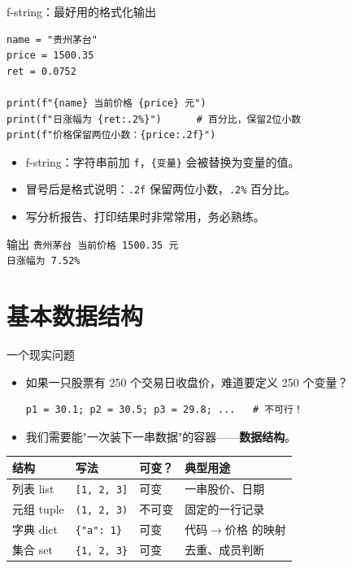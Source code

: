 \documentclass[9pt]{ctexbeamer}
\begin{document}
\begin{frame}[fragile]{f-string：最好用的格式化输出}
	\begin{lstlisting}
name = "贵州茅台"
price = 1500.35
ret = 0.0752

print(f"{name} 当前价格 {price} 元")
print(f"日涨幅为 {ret:.2%}")      # 百分比，保留2位小数
print(f"价格保留两位小数：{price:.2f}")
\end{lstlisting}
	\begin{itemize}
		\item f-string：字符串前加 \texttt{f}，\texttt{\{变量\}} 会被替换为变量的值。
		\item 冒号后是格式说明：\texttt{.2f} 保留两位小数，\texttt{.2\%} 百分比。
		\item 写分析报告、打印结果时非常常用，务必熟练。
	\end{itemize}
	\begin{exampleblock}{输出}
		\texttt{贵州茅台 当前价格 1500.35 元}\\
		\texttt{日涨幅为 7.52\%}
	\end{exampleblock}
\end{frame}


\section{基本数据结构}

\begin{frame}[fragile]{一个现实问题}
	\begin{itemize}
		\item 如果一只股票有 250 个交易日收盘价，难道要定义 250 个变量？
		\begin{lstlisting}
p1 = 30.1; p2 = 30.5; p3 = 29.8; ...   # 不可行！
\end{lstlisting}
		\item 我们需要能"一次装下一串数据"的容器——\textbf{数据结构}。
	\end{itemize}
	\begin{table}
		\centering
		\begin{tabular}{llll}
			\toprule
			结构 & 写法 & 可变？ & 典型用途 \\
			\midrule
			列表 list & \texttt{[1, 2, 3]} & 可变 & 一串股价、日期 \\
			元组 tuple & \texttt{(1, 2, 3)} & 不可变 & 固定的一行记录 \\
			字典 dict & \texttt{\{"a": 1\}} & 可变 & 代码$\to$价格 的映射 \\
			集合 set & \texttt{\{1, 2, 3\}} & 可变 & 去重、成员判断 \\
			\bottomrule
		\end{tabular}
	\end{table}
\end{frame}
\end{document}
